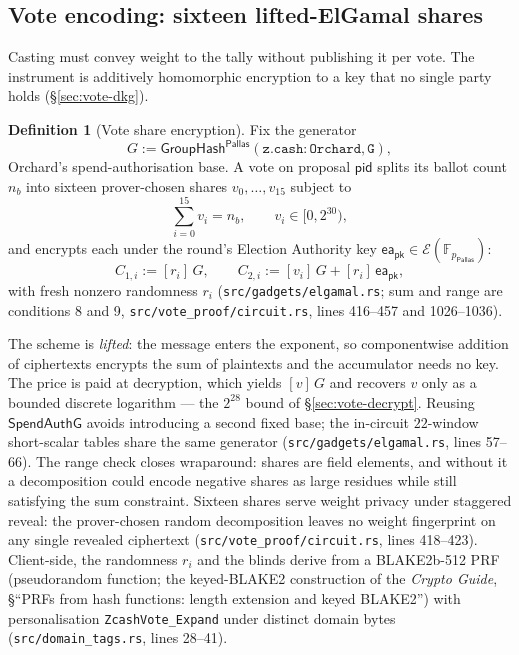 \documentclass[11pt,a4paper]{article}
\theoremstyle{definition}
\newtheorem{definition}[theorem]{Definition}
\newcommand{\F}{\mathbb{F}}
\newcommand{\Pallas}{\ensuremath{\mathsf{Pallas}}}
\newcommand{\Ep}{\ensuremath{\mathcal{E}}}
\newcommand{\GroupHash}{\ensuremath{\mathsf{GroupHash}}}
\begin{document}
\subsection{Vote encoding: sixteen lifted-ElGamal shares}
\label{sec:vote-elgamal}

Casting must convey weight to the tally without publishing it per vote. The
instrument is additively homomorphic encryption to a key that no single
party holds (\S\ref{sec:vote-dkg}).

\begin{definition}[Vote share encryption]\label{def:vote-elgamal}
Fix the generator
\[
G := \GroupHash^{\Pallas}(\mathtt{z.cash:Orchard}, \mathtt{G}),
\]
Orchard's spend-authorisation base. A vote on proposal
$\mathsf{pid}$ splits its ballot count $n_b$ into sixteen prover-chosen
shares $v_0, \ldots, v_{15}$ subject to
\[
\sum_{i=0}^{15} v_i = n_b, \qquad v_i \in [0, 2^{30}),
\]
and encrypts each under the round's Election Authority key
$\mathsf{ea_{pk}} \in \Ep(\F_{p_{\Pallas}})$:
\[
C_{1,i} := [r_i]\,G, \qquad
C_{2,i} := [v_i]\,G + [r_i]\,\mathsf{ea_{pk}},
\]
with fresh nonzero randomness $r_i$
(\texttt{src/gadgets/elgamal.rs}; sum and range are conditions 8 and 9,
\texttt{src/vote\_proof/circuit.rs}, lines 416--457 and 1026--1036).
\end{definition}

The scheme is \emph{lifted}: the message enters the exponent, so
componentwise addition of ciphertexts encrypts the sum of plaintexts and the
accumulator needs no key. The price is paid at decryption, which yields
$[v]\,G$ and recovers $v$ only as a bounded discrete logarithm --- the
$2^{28}$ bound of \S\ref{sec:vote-decrypt}. Reusing $\mathsf{SpendAuthG}$
avoids introducing a second fixed base; the in-circuit $22$-window
short-scalar tables share the same generator
(\texttt{src/gadgets/elgamal.rs}, lines 57--66). The range check closes
wraparound: shares are field elements, and without it a decomposition could
encode negative shares as large residues while still satisfying the sum
constraint. Sixteen shares serve weight privacy under staggered reveal: the
prover-chosen random decomposition leaves no weight fingerprint on any
single revealed ciphertext (\texttt{src/vote\_proof/circuit.rs}, lines
418--423). Client-side, the randomness $r_i$ and the blinds derive from a
BLAKE2b-512 PRF (pseudorandom function; the keyed-BLAKE2 construction of
the \emph{Crypto Guide}, \S``PRFs from hash functions: length extension
and keyed BLAKE2'') with personalisation \texttt{ZcashVote\_Expand} under
distinct domain bytes (\texttt{src/domain\_tags.rs}, lines 28--41).
\end{document}
